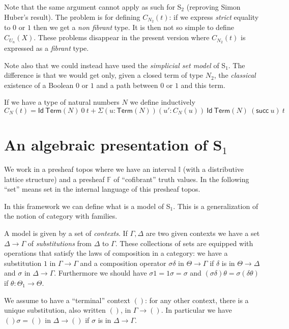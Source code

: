 \documentclass[10pt,a4paper]{article}
\newcommand{\II}{\mathbb{I}}
\newcommand{\FF}{\mathbb{F}}
\newcommand{\Id}{\mathsf{Id}}
\def\Term{\mathsf{Term}}
\def\succV{\mathsf{succ}}
\newcommand{\id}{{1}}
\begin{document}
\medskip

 Note that the same argument cannot apply as such for S$_2$ (reproving Simon Huber's result).
The problem is for defining $C_{N_2}(t)$: if we express {\em strict} equality to $0$ or $1$
then we get a {\em non fibrant} type. It is then not so simple to define $C_{U_n}(X)$.
These problems disappear in the present version where $C_{N_2}(t)$ is expressed as
a {\em fibrant} type.

\medskip

 Note also that we could instead have used the {\em simplicial set model} of S$_1$.
The difference is that we would get only, given a closed term of type $N_2$, the {\em classical} existence
of a Boolean $0$ or $1$ and a path between $0$ or $1$ and this term.



\medskip

 If we have a type of natural numbers $N$ we define inductively
$$C_{N}(t) = \Id~\Term(N)~0~t+\Sigma (u:\Term(N))(u':C_{N}(u))~\Id~\Term(N)~(\succV~u)~t$$

\newpage

\section*{An algebraic presentation of S$_1$}

 We work in a presheaf topos where we have an interval $\II$ (with a distributive lattice structure)
and a presheaf
$\FF$ of ``cofibrant'' truth values. In the following ``set'' means set in the internal
language of this presheaf topos.

 In this framework we can define what is a model of S$_1$. This is a generalization
of the notion of category with families.

A model is given by a set of {\em contexts}. 
If $\Gamma,\Delta$ are two given contexts
we have a set $\Delta\rightarrow\Gamma$ of {\em substitutions} from $\Delta$ to $\Gamma$.
These collections of sets are equipped with operations that
satisfy the laws of composition in a category: we have a substitution $\id$ 
in $\Gamma\rightarrow\Gamma$ and
a composition operator $\sigma\delta$ in $\Theta\rightarrow\Gamma$ if
$\delta$ is in $\Theta\rightarrow\Delta$ and $\sigma$ in $\Delta\rightarrow\Gamma$. Furthermore
we should have $\sigma \id = \id \sigma = \sigma$ and 
$(\sigma\delta)\theta = \sigma(\delta\theta)$ if $\theta:\Theta_1\rightarrow\Theta$.

 We assume to have a ``terminal'' context $()$: for any other context, there is a 
unique substitution, also written $()$, in $\Gamma\rightarrow ()$. In particular
we have $()\sigma = ()$ in $\Delta\rightarrow ()$ if $\sigma$ is in 
$\Delta\rightarrow \Gamma$. 
\end{document}

